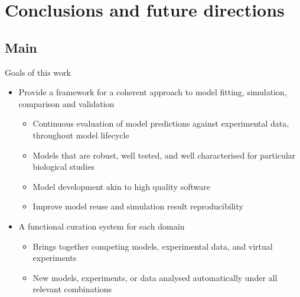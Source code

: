\documentclass[t,xcolor={usenames,dvipsnames}]{beamer}
\begin{document}
\section{Conclusions and future directions}
\subsection*{Main}

\begin{frame}{Goals of this work}
\begin{itemize}[<+->]
\item Provide a framework for a coherent approach to model fitting, simulation, comparison and validation
  \begin{itemize}[<.->]
  \item Continuous evaluation of model predictions against experimental data, throughout model lifecycle
  \item Models that are robust, well tested, and well characterised for particular biological studies
  \item Model development akin to high quality software
  \item Improve model reuse and simulation result reproducibility
  \end{itemize}
\item A functional curation system \alert{for each domain}
  \begin{itemize}[<.->]
  \item Brings together competing models, experimental data, and virtual experiments
  \item New models, experiments, or data analysed automatically under all relevant combinations
  \end{itemize}
\end{itemize}
\end{frame}
\end{document}
